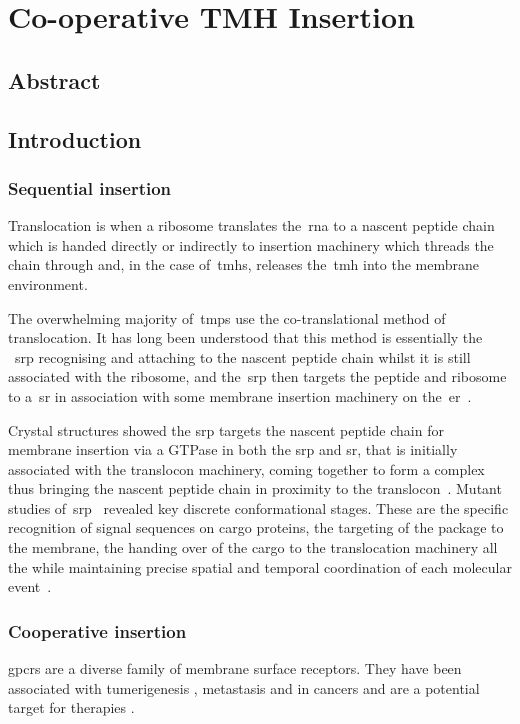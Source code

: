 
\chapter{Co-operative TMH Insertion}
\section{Abstract}
\section{Introduction}
\subsection{Sequential insertion}

Translocation is when a ribosome translates the~\gls{rna} to a nascent peptide chain which is handed directly or indirectly to insertion machinery which threads the chain through and, in the case of~\gls{tmh}s, releases the~\gls{tmh} into the membrane environment.

The overwhelming majority of~\gls{tmp}s use the co-translational method of translocation.
It has long been understood that this method is essentially the ~\gls{srp} recognising and attaching to the nascent peptide chain whilst it is still associated with the ribosome, and the~\gls{srp} then targets the peptide and ribosome to a~\gls{sr} in association with some membrane insertion machinery on the~\gls{er}~\cite{Pool2005, Hessa2005}.

Crystal structures showed the \gls{srp} targets the nascent peptide chain for membrane insertion via a GTPase in both the \gls{srp} and \gls{sr}, that is initially associated with the translocon machinery, coming together to form a complex thus bringing the nascent peptide chain in proximity to the translocon~\cite{Shan2005}.
Mutant studies of~\gls{srp}~\cite{Shan2005} revealed key discrete conformational stages.
These are the specific recognition of signal sequences on cargo proteins, the targeting of the package to the membrane, the handing over of the cargo to the translocation machinery all the while maintaining precise spatial and temporal coordination of each molecular event~\cite{Saraogi2011}.

\subsection{Cooperative insertion}

\gls{gpcr}s are a diverse family of membrane surface receptors.
They have been associated with tumerigenesis \cite{OHayre2013}, metastasis \cite{Singh2015} and in cancers \cite{Bar-Shavit2016} and are a potential target for therapies \cite{Arakaki2018}.




